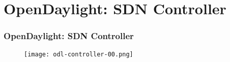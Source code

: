 \section{OpenDaylight: SDN Controller}

\begin{frame}
\frametitle{OpenDaylight: SDN Controller}

\begin{center}
  \begin{figure}
    \texttt{[image: odl-controller-00.png]}
  \end{figure}
\end{center}

\end{frame}
